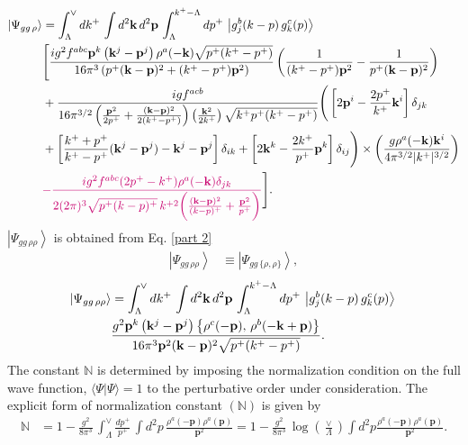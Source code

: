 \documentclass[a4paper,11pt]{article}
\def\v#1{\mathbf{#1}}
\def\mf#1{\mathbb{#1}}
\begin{document}
\begin{align}\label{psiggrhomom}
    \left|\Psi_{gg\,\rho}\right\rangle  & = \int_{\Lambda}^{\vee}dk^{+}\,\int d^{2}\mathbf{k}\, d^{2}\mathbf{p}\,\int_{\Lambda}^{k^{+}-\Lambda}dp^{+}\,\left|g_{j}^{b}(k-p)\, g_{k}^{c}(p)\right\rangle\,\notag \\ & \Bigg[\frac{ig^{2}f^{abc}\mathbf{p}^{k}\left(\mathbf{k}^{j}-\mathbf{p}^{j}\right)\rho^{a}(-\mathbf{k})\sqrt{p^{+}(k^{+}-p^{+})}}{16\pi^{3}\left(p^{+}(\mathbf{k}-\mathbf{p})^{2}+(k^{+}-p^{+})\mathbf{p}^{2}\right)}  \left(\frac{1}{(k^{+}-p^{+})\mathbf{p}^{2}}-\frac{1}{p^{+}(\mathbf{k}-\mathbf{p})^{2}}\right) \notag \\ & + \frac{igf^{acb}}{16\pi^{3/2}\left(\frac{\mathbf{p}^{2}}{2p^{+}}+\frac{(\mathbf{k}-\mathbf{p})^{2}}{2(k^{+}-p^{+})}\right)\left(\frac{\mathbf{k}^{2}}{2k^{+}}\right)\sqrt{k^{+}p^{+}(k^{+}-p^{+})}}
\Bigg(\left[2\mathbf{p}^{i}-\frac{2p^{+}}{k^{+}}\mathbf{k}^{i}\right]\delta_{jk}\notag \\ & +\left[\frac{k^{+}+p^{+}}{k^{+}-p^{+}}(\mathbf{k}^{j}-\mathbf{p}^{j})-\mathbf{k}^{j}-\mathbf{p}^{j}\right]\delta_{ik} +\left[2\mathbf{k}^{k}-\frac{2k^{+}}{p^{+}}\mathbf{p}^{k}\right]\delta_{ij}\Bigg)\times
\left(\frac{g\rho^{a}(-\mathbf{k})\mathbf{k}^{i}}{4\pi^{3/2}|k^{+}|^{3/2}}\right) \notag \\ & {\color{chg}-\frac{ig^{2}f^{abc}(2p^{+}-k^{+})\rho^{a}(-\v{k})\delta_{jk}}{2(2\pi)^{3}\sqrt{p^{+}(k-p)^{+}}\,k^{+ 2}\bigg(\frac{(\v{k-p})^{2}}{(k-p)^{+}}+\frac{\v{p}^{2}}{p^{+}}\bigg)}}\Bigg]. 
\end{align}
$\left|\Psi_{gg\,\rho\rho}\right\rangle$ is obtained from Eq. \eqref{part 2}
\begin{align}
    \left|\Psi_{gg\, \rho\rho}\right\rangle & \equiv \left|\Psi_{gg\, \{\rho,\rho\}}\right\rangle,
\end{align}
\begin{align}\label{ggrhorhomom}
\left|\Psi_{gg\,\rho\rho}\right\rangle & = \int_{\Lambda}^{\vee}dk^{+}\,\int d^{2}\mathbf{k}\, d^{2}\mathbf{p}\,\int_{\Lambda}^{k^{+}-\Lambda}dp^{+}\,\left|g_{j}^{b}(k-p)\, g_{k}^{c}(p)\right\rangle\, \notag \\ 
& \frac{g^{2}\mathbf{p}^{k}\left(\mathbf{k}^{j}-\mathbf{p}^{j}\right)\left\{ \rho^{c}(-\mathbf{p}),\,\rho^{b}(-\mathbf{k}+\mathbf{p})\right\} }{16\pi^{3}\mathbf{p}^{2}(\mathbf{k}-\mathbf{p})^{2}\sqrt{p^{+}(k^{+}-p^{+})}}. 
\end{align}
The constant $\mf{N}$ is determined by imposing the normalization condition on the full wave function, $\langle\Psi|\Psi\rangle = 1$ to the perturbative order under consideration. The explicit form of normalization constant $(\mf{N})$ is given by
\begin{align}\label{normmom}
    \mf{N} & = 1- \frac{g^2}{8 \pi^3 }\, \int_{\Lambda}^{\vee} \frac{dp^{+}}{p^{+}}\,
  \int d^2p\, \frac{\rho^a(-\v{p}) \rho^a(\v{p})}{\v{p}^2} =   1 - \frac{g^2}{8 \pi^3 }\,\log{\left(\frac{\vee}{\Lambda}\right)}
  \int d^2p \frac{\rho^a(-\v{p}) \rho^a(\v{p})}{\v{p}^2}.
\end{align}
\end{document}
